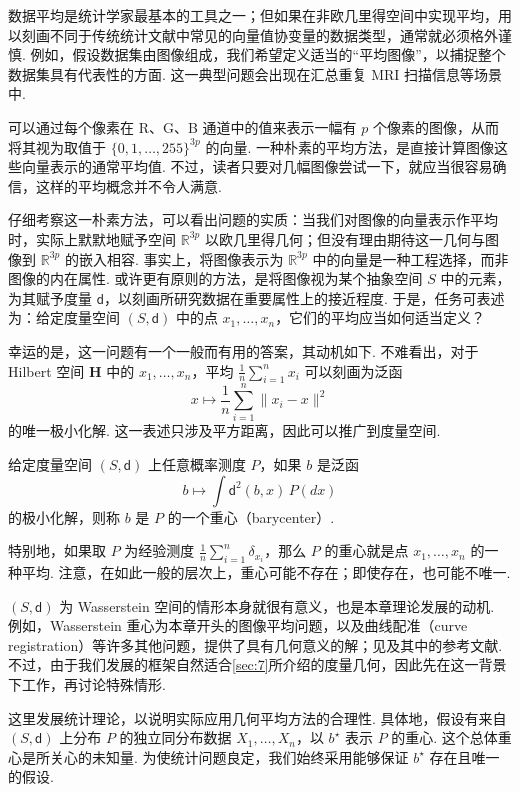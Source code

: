 数据平均是统计学家最基本的工具之一；但如果在非欧几里得空间中实现平均，用以刻画不同于传统统计文献中常见的向量值协变量的数据类型，通常就必须格外谨慎. 例如，假设数据集由图像组成，我们希望定义适当的“平均图像”，以捕捉整个数据集具有代表性的方面. 这一典型问题会出现在汇总重复 MRI 扫描信息等场景中.

可以通过每个像素在 R、G、B 通道中的值来表示一幅有 $p$ 个像素的图像，从而将其视为取值于 $\{0,1,\ldots,255\}^{3p}$ 的向量. 一种朴素的平均方法，是直接计算图像这些向量表示的通常平均值. 不过，读者只要对几幅图像尝试一下，就应当很容易确信，这样的平均概念并不令人满意.

仔细考察这一朴素方法，可以看出问题的实质：当我们对图像的向量表示作平均时，实际上默默地赋予空间 $\mathbb R^{3p}$ 以欧几里得几何；但没有理由期待这一几何与图像到 $\mathbb R^{3p}$ 的嵌入相容. 事实上，将图像表示为 $\mathbb R^{3p}$ 中的向量是一种工程选择，而非图像的内在属性. 或许更有原则的方法，是将图像视为某个抽象空间 $S$ 中的元素，为其赋予度量 $\mathsf d$，以刻画所研究数据在重要属性上的接近程度. 于是，任务可表述为：给定度量空间 $(S,\mathsf d)$ 中的点 $x_1,\ldots,x_n$，它们的平均应当如何适当定义？

幸运的是，这一问题有一个一般而有用的答案，其动机如下. 不难看出，对于 Hilbert 空间 $\mathbf H$ 中的 $x_1,\ldots,x_n$，平均 $\frac1n\sum_{i=1}^n x_i$ 可以刻画为泛函
$$x\longmapsto\frac1n\sum_{i=1}^n\|x_i-x\|^2$$
的唯一极小化解. 这一表述只涉及平方距离，因此可以推广到度量空间.
\begin{definition}[重心]\label{def:8.1}
给定度量空间 $(S,\mathsf d)$ 上任意概率测度 $P$，如果 $b$ 是泛函
$$b\longmapsto\int\mathsf d^2(b,x)\,P(dx)$$
的极小化解，则称 $b$ 是 $P$ 的一个重心（barycenter）.
\end{definition}
特别地，如果取 $P$ 为经验测度 $\frac1n\sum_{i=1}^n\delta_{x_i}$，那么 $P$ 的重心就是点 $x_1,\ldots,x_n$ 的一种平均. 注意，在如此一般的层次上，重心可能不存在；即使存在，也可能不唯一.

$(S,\mathsf d)$ 为 Wasserstein 空间的情形本身就很有意义，也是本章理论发展的动机. 例如，Wasserstein 重心为本章开头的图像平均问题，以及曲线配准（curve registration）等许多其他问题，提供了具有几何意义的解；见\cite{ref48,ref98,ref155,ref198,ref252,ref257,ref266,ref289,ref290}及其中的参考文献. 不过，由于我们发展的框架自然适合\autoref{sec:7}所介绍的度量几何，因此先在这一背景下工作，再讨论特殊情形.

这里发展统计理论，以说明实际应用几何平均方法的合理性. 具体地，假设有来自 $(S,\mathsf d)$ 上分布 $P$ 的独立同分布数据 $X_1,\ldots,X_n$，以 $b^\star$ 表示 $P$ 的重心. 这个总体重心是所关心的未知量. 为使统计问题良定，我们始终采用能够保证 $b^\star$ 存在且唯一的假设.

